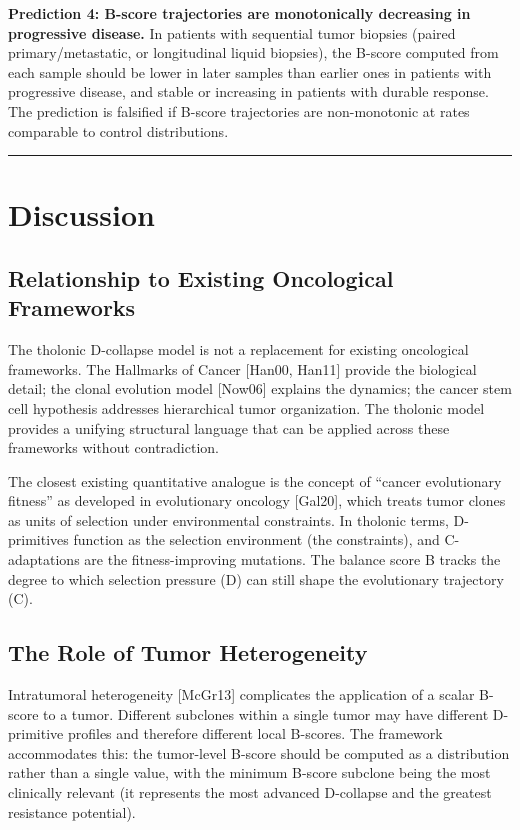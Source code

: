 \documentclass[12pt]{article}
\begin{document}
\textbf{Prediction 4: B-score trajectories are monotonically decreasing
in progressive disease.} In patients with sequential tumor biopsies
(paired primary/metastatic, or longitudinal liquid biopsies), the
B-score computed from each sample should be lower in later samples than
earlier ones in patients with progressive disease, and stable or
increasing in patients with durable response. The prediction is
falsified if B-score trajectories are non-monotonic at rates comparable
to control distributions.

\begin{center}\rule{0.5\linewidth}{0.5pt}\end{center}

\section{Discussion}\label{discussion}

\subsection{Relationship to Existing Oncological Frameworks}\label{relationship-to-existing-oncological-frameworks}

The tholonic D-collapse model is not a replacement for existing
oncological frameworks. The Hallmarks of Cancer {[}Han00, Han11{]}
provide the biological detail; the clonal evolution model {[}Now06{]}
explains the dynamics; the cancer stem cell hypothesis addresses
hierarchical tumor organization. The tholonic model provides a unifying
structural language that can be applied across these frameworks without
contradiction.

The closest existing quantitative analogue is the concept of ``cancer
evolutionary fitness'' as developed in evolutionary oncology
{[}Gal20{]}, which treats tumor clones as units of selection under
environmental constraints. In tholonic terms, D-primitives function as
the selection environment (the constraints), and C-adaptations are the
fitness-improving mutations. The balance score B tracks the degree to
which selection pressure (D) can still shape the evolutionary trajectory
(C).

\subsection{The Role of Tumor Heterogeneity}\label{the-role-of-tumor-heterogeneity}

Intratumoral heterogeneity {[}McGr13{]} complicates the application of a
scalar B-score to a tumor. Different subclones within a single tumor may
have different D-primitive profiles and therefore different local
B-scores. The framework accommodates this: the tumor-level B-score
should be computed as a distribution rather than a single value, with
the minimum B-score subclone being the most clinically relevant (it
represents the most advanced D-collapse and the greatest resistance
potential).
\end{document}
